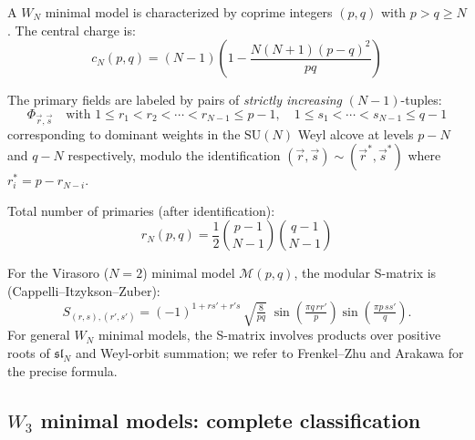 \begin{definition}\label{def:wn-minimal}
A $W_N$ minimal model is characterized by coprime integers $(p,q)$ with $p > q \geq N$. The central charge is:
\begin{equation}
c_{N}(p,q) = (N-1)\left(1 - \frac{N(N+1)(p-q)^2}{pq}\right)
\end{equation}

The primary fields are labeled by pairs of \emph{strictly increasing} $(N{-}1)$-tuples:
\[\Phi_{\vec{r},\vec{s}} \quad \text{with } 1 \leq r_1 < r_2 < \cdots < r_{N-1} \leq p-1, \quad 1 \leq s_1 < \cdots < s_{N-1} \leq q-1\]
corresponding to dominant weights in the $\mathrm{SU}(N)$ Weyl alcove at levels $p-N$ and $q-N$ respectively, modulo the identification $(\vec{r},\vec{s}) \sim (\vec{r}^*, \vec{s}^*)$ where $r_i^* = p - r_{N-i}$.

Total number of primaries (after identification):
\[r_N(p,q) = \frac{1}{2}\binom{p-1}{N-1}\binom{q-1}{N-1}\]
\end{definition}

\begin{theorem}\label{thm:wn-s-matrix}
For the Virasoro ($N=2$) minimal model $\mathcal{M}(p,q)$, the modular
S-matrix is (Cappelli--Itzykson--Zuber):
\begin{equation}
S_{(r,s),(r',s')} = (-1)^{1+rs'+r's}\,\sqrt{\tfrac{8}{pq}}\;
\sin\!\left(\tfrac{\pi q\, r r'}{p}\right)
\sin\!\left(\tfrac{\pi p\, s s'}{q}\right).
\end{equation}
For general $W_N$ minimal models, the S-matrix involves products
over positive roots of $\mathfrak{sl}_N$ and Weyl-orbit summation;
we refer to Frenkel--Zhu \cite{FZ92} and Arakawa \cite{Arakawa17}
for the precise formula.
\end{theorem}

\subsection{\texorpdfstring{$W_3$ minimal models: complete classification}{W 3 minimal models: complete classification}}
\label{subsec:w3-minimal-complete}


